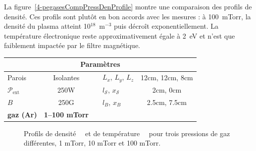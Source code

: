 \begin{refsection}
	 La
	figure~\ref{4-pegasesCompPressDenProfile} montre une comparaison des profils de densité. Ces profils sont plutôt en bon accords avec les
	mesures :
	à 100~mTorr, la densité du plasma atteint 10$^{18}$~m$^{-3}$ puis décroît
	exponentiellement.  La température électronique reste approximativement égale à
	2~eV et n'est que faiblement impactée par le filtre magnétique.
	\bigskip
	
\begin{minipage}{\textwidth}
\footnotesize\centering
{}
\begin{tabular}{lcclc}\toprule
\multicolumn{5}{c}{\bf Paramètres}\\
\midrule 
Parois & Isolantes &&$L_x$, $L_y$, $L_z$  & 12cm, 12cm,
8cm\\
$\mathcal{P}_\text{ext}$&250W&&$l_\mathcal{S}$, $x_\mathcal{S}$&2cm, 0cm\\
$B$&250G&&$l_B$, $x_B$&2.5cm, 7.5cm\\

\textbf{gaz (Ar)} & \textbf{1--100 mTorr}&&&\\
\bottomrule
\end{tabular}
\label{4-PegasesScanPreParam}
\end{minipage}
	
\begin{figure}[!htbp]
  \centering
    \caption{Profils de densité~~ et de
    température~~ pour trois pressions de
    gaz différentes, 1 mTorr, 10 mTorr et 100 mTorr.}
    \label{pegasesCompPressProfils}
\end{figure}
	

\end{refsection}
